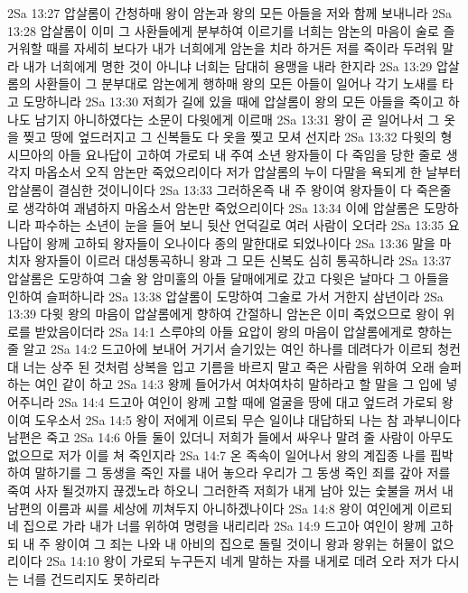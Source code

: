 2Sa 13:27  압살롬이 간청하매 왕이 암논과 왕의 모든 아들을 저와 함께 보내니라
2Sa 13:28  압살롬이 이미 그 사환들에게 분부하여 이르기를 너희는 암논의 마음이 술로 즐거워할 때를 자세히 보다가 내가 너희에게 암논을 치라 하거든 저를 죽이라 두려워 말라 내가 너희에게 명한 것이 아니냐 너희는 담대히 용맹을 내라 한지라
2Sa 13:29  압살롬의 사환들이 그 분부대로 암논에게 행하매 왕의 모든 아들이 일어나 각기 노새를 타고 도망하니라
2Sa 13:30  저희가 길에 있을 때에 압살롬이 왕의 모든 아들을 죽이고 하나도 남기지 아니하였다는 소문이 다윗에게 이르매
2Sa 13:31  왕이 곧 일어나서 그 옷을 찢고 땅에 엎드러지고 그 신복들도 다 옷을 찢고 모셔 선지라
2Sa 13:32  다윗의 형 시므아의 아들 요나답이 고하여 가로되 내 주여 소년 왕자들이 다 죽임을 당한 줄로 생각지 마옵소서 오직 암논만 죽었으리이다 저가 압살롬의 누이 다말을 욕되게 한 날부터 압살롬이 결심한 것이니이다
2Sa 13:33  그러하온즉 내 주 왕이여 왕자들이 다 죽은줄로 생각하여 괘념하지 마옵소서 암논만 죽었으리이다
2Sa 13:34  이에 압살롬은 도망하니라 파수하는 소년이 눈을 들어 보니 뒷산 언덕길로 여러 사람이 오더라
2Sa 13:35  요나답이 왕께 고하되 왕자들이 오나이다 종의 말한대로 되었나이다
2Sa 13:36  말을 마치자 왕자들이 이르러 대성통곡하니 왕과 그 모든 신복도 심히 통곡하니라
2Sa 13:37  압살롬은 도망하여 그술 왕 암미훌의 아들 달매에게로 갔고 다윗은 날마다 그 아들을 인하여 슬퍼하니라
2Sa 13:38  압살롬이 도망하여 그술로 가서 거한지 삼년이라
2Sa 13:39  다윗 왕의 마음이 압살롬에게 향하여 간절하니 암논은 이미 죽었으므로 왕이 위로를 받았음이더라
2Sa 14:1  스루야의 아들 요압이 왕의 마음이 압살롬에게로 향하는 줄 알고
2Sa 14:2  드고아에 보내어 거기서 슬기있는 여인 하나를 데려다가 이르되 청컨대 너는 상주 된 것처럼 상복을 입고 기름을 바르지 말고 죽은 사람을 위하여 오래 슬퍼하는 여인 같이 하고
2Sa 14:3  왕께 들어가서 여차여차히 말하라고 할 말을 그 입에 넣어주니라
2Sa 14:4  드고아 여인이 왕께 고할 때에 얼굴을 땅에 대고 엎드려 가로되 왕이여 도우소서
2Sa 14:5  왕이 저에게 이르되 무슨 일이냐 대답하되 나는 참 과부니이다 남편은 죽고
2Sa 14:6  아들 둘이 있더니 저희가 들에서 싸우나 말려 줄 사람이 아무도 없으므로 저가 이를 쳐 죽인지라
2Sa 14:7  온 족속이 일어나서 왕의 계집종 나를 핍박하여 말하기를 그 동생을 죽인 자를 내어 놓으라 우리가 그 동생 죽인 죄를 갚아 저를 죽여 사자 될것까지 끊겠노라 하오니 그러한즉 저희가 내게 남아 있는 숯불을 꺼서 내 남편의 이름과 씨를 세상에 끼쳐두지 아니하겠나이다
2Sa 14:8  왕이 여인에게 이르되 네 집으로 가라 내가 너를 위하여 명령을 내리리라
2Sa 14:9  드고아 여인이 왕께 고하되 내 주 왕이여 그 죄는 나와 내 아비의 집으로 돌릴 것이니 왕과 왕위는 허물이 없으리이다
2Sa 14:10  왕이 가로되 누구든지 네게 말하는 자를 내게로 데려 오라 저가 다시는 너를 건드리지도 못하리라
